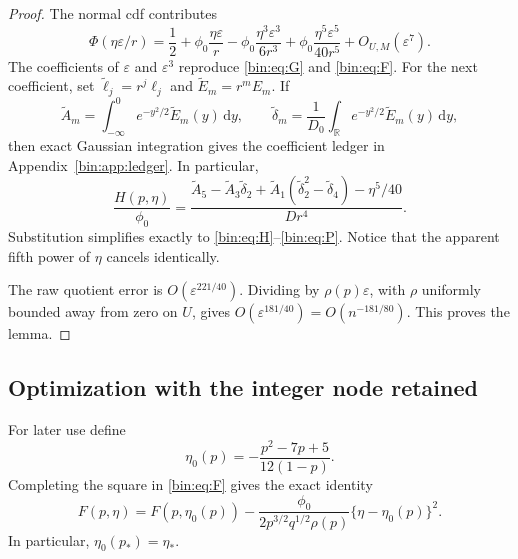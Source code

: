 \documentclass[11pt,a4paper]{article}
\numberwithin{equation}{section}
\theoremstyle{definition}
\theoremstyle{remark}
\newcommand{\dd}{\,\mathrm d}
\newcommand{\phiZ}{\phi_0}
\newcommand{\eps}{\varepsilon}
\begin{document}
\begin{proof}
The normal cdf contributes
\begin{equation}\label{bin:eq:normalexp}
 \Phi(\eta\eps/r)
 =\frac12+\phiZ\frac{\eta\eps}{r}
 -\phiZ\frac{\eta^3\eps^3}{6r^3}
 +\phiZ\frac{\eta^5\eps^5}{40r^5}
 +O_{U,M}(\eps^7).
\end{equation}
The coefficients of $\eps$ and $\eps^3$ reproduce \eqref{bin:eq:G} and
\eqref{bin:eq:F}.  For the next coefficient, set
$\widetilde\ell_j=r^j\ell_j$ and
$\widetilde E_m=r^mE_m$.  If
\[
 \widetilde A_m=\int_{-\infty}^0e^{-y^2/2}\widetilde E_m(y)\dd y,
 \qquad
 \widetilde\delta_m=\frac1{D_0}
 \int_{\mathbb R}e^{-y^2/2}\widetilde E_m(y)\dd y,
\]
then exact Gaussian integration gives the coefficient ledger in
Appendix~\ref{bin:app:ledger}.  In particular,
\begin{equation}\label{bin:eq:Hledger}
 \frac{H(p,\eta)}{\phiZ}
 =\frac{
 \widetilde A_5-\widetilde A_3\widetilde\delta_2
 +\widetilde A_1(\widetilde\delta_2^2-\widetilde\delta_4)
 -\eta^5/40
 }{Dr^4}.
\end{equation}
Substitution simplifies exactly to \eqref{bin:eq:H}--\eqref{bin:eq:P}.  Notice
that the apparent fifth power of $\eta$ cancels identically.

The raw quotient error is $O(\eps^{221/40})$.  Dividing by
$\rho(p)\eps$, with $\rho$ uniformly bounded away from zero on $U$, gives
$O(\eps^{181/40})=O(n^{-181/80})$.  This proves the lemma.
\end{proof}

\subsection{Optimization with the integer node retained}

For later use define
\[
 \eta_0(p)=-\frac{p^2-7p+5}{12(1-p)}.
\]
Completing the square in \eqref{bin:eq:F} gives the exact identity
\begin{equation}\label{bin:eq:Fquad}
 F(p,\eta)=F(p,\eta_0(p))
 -\frac{\phiZ}{2p^{3/2}q^{1/2}\rho(p)}
 \{\eta-\eta_0(p)\}^2.
\end{equation}
In particular, $\eta_0(p_*)=\eta_*$.
\end{document}
